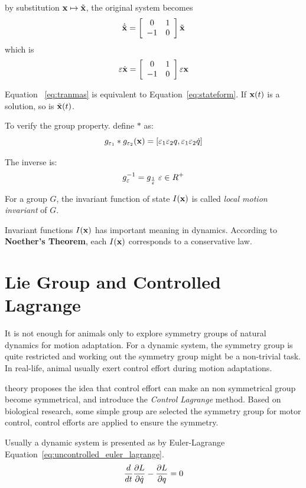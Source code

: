 by substitution $\mathbf{x} \mapsto \tilde{\mathbf{x}}$, the original system becomes
\[ 
\dot{\tilde{\mathbf{x}}}=
\left[ 
\begin{array}{cc}
0 &1\\
-1 &0 
\end{array}
\right]\tilde{\mathbf{x}}
\]
which is 
\begin{equation}
\label{eq:tranmas} 
\varepsilon \dot{\mathbf{x}}=
\left[ 
\begin{array}{cc}
0 &1\\
-1 &0 
\end{array}
\right]\varepsilon \mathbf{x}
\end{equation}

Equation ~\ref{eq:tranmas} is equivalent to  Equation~\ref{eq:stateform}.
If $\mathbf{x}(t)$ is a solution, so is $\tilde{\mathbf{x}}(t)$.

To verify the group property. define $*$ as:
\[
g_{\varepsilon_1}*g_{\varepsilon_2}(\mathbf{x})=[\varepsilon_1 \varepsilon_2 q, \varepsilon_1 \varepsilon_2 \dot{q}]
\]

The inverse is:
\[
g_{\varepsilon}^{-1}=g_{\frac{1}{\varepsilon}} \;\varepsilon \in R^+
\]

\begin{mydef}
For a group $G$, the invariant function of state $I(\mathbf{x})$ is called \emph{local motion invariant} of $G$. 
\end{mydef}

Invariant functions $I(\mathbf{x})$ has important  meaning in dynamics. 
According  to \textbf{Noether's Theorem}, each $I(\mathbf{x})$ corresponds to a conservative law. 


\section{Lie Group and Controlled Lagrange}
\label{sec:liecontrol}
It is not enough for animals  only to  explore symmetry groups of natural dynamics for motion adaptation.
For a dynamic system, the symmetry group is quite restricted and  working out the symmetry group might be a non-trivial task.
In real-life, animal usually exert control effort during motion adaptations.

\moit theory proposes the idea that control effort can make an non symmetrical group become symmetrical, and introduce the \emph{Control Lagrange} method.
Based on biological research\citep{flash2007affine}, some simple group are selected the symmetry group for motor control,
control efforts are applied to ensure the symmetry.


Usually a dynamic system is presented as by Euler-Lagrange Equation~\ref{eq:uncontrolled_euler_lagrange}\citep{Goldstein2002}.
\begin{equation}
\frac{d}{dt} \frac{\partial L}{\partial \dot{q}} - \frac{\partial L}{\partial q} = 0
\label{eq:uncontrolled_euler_lagrange}
\end{equation}


